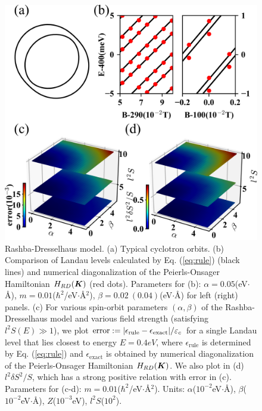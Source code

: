 \documentclass[aps, prb, showpacs, twocolumn, notitlepage, superscriptaddress]{revtex4-1}
\begin{document}


\begin{figure}
\includegraphics[width=1.0\columnwidth]{RD.png}
\caption{Rashba-Dresselhaus model. (a) Typical cyclotron orbits. (b) Comparison of Landau levels calculated by Eq. (\ref{eq:rule}) (black lines) and numerical diagonalization of the Peierls-Onsager Hamiltonian  $H_{RD}(\boldsymbol{K})$ (red dots). Parameters for (b): $\alpha=0.05$(eV$\cdot$\AA), $m=0.01$($\hbar^2$/eV$\cdot$\AA$^2$), $\beta=0.02~(0.04)$(eV$\cdot$\AA) for left (right) panels. (c) For various spin-orbit parameters $(\alpha,\beta)$ of the Rashba-Dresselhaus model and various field strength (satisfying $l^2S(E)\gg 1$), we plot  $\text{error}:=|\epsilon_\text{rule}-\epsilon_\text{exact}|/\varepsilon_c$ for a single Landau level that lies closest to energy $E=0.4eV$, where $\epsilon_\text{rule}$ is determined by Eq. (\ref{eq:rule}) and $\epsilon_{\text{exact}}$ is obtained by numerical diagonalization of the Peierls-Onsager Hamiltonian  $H_{RD}(\boldsymbol{K})$. We also plot in (d) $l^2\delta S^2/S$, which has a strong positive relation with error in (c). Parameters for (c-d): $m=0.01$($\hbar^2$/eV$\cdot$\AA$^2$). Units: $\alpha$($10^{-2}$eV$\cdot$\AA), $\beta$($10^{-2}$eV$\cdot$\AA), $Z$($10^{-3}$eV), $l^2 S$($10^2$).\label{fig:RD}}
\end{figure}
\end{document}
